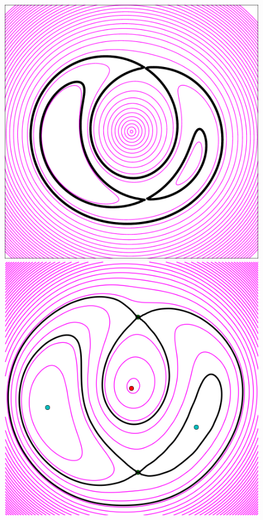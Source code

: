 \documentclass[usenatbib]{mn2e}
\newlength{\myplotswidth}
\begin{document}
\begin{figure}
  \includegraphics[width=\myplotswidth]{fig/ASW0000h2m_007022_arriv}
  \includegraphics[width=\myplotswidth]{fig/007022_spaghetti} \\

\end{figure}
\end{document}

